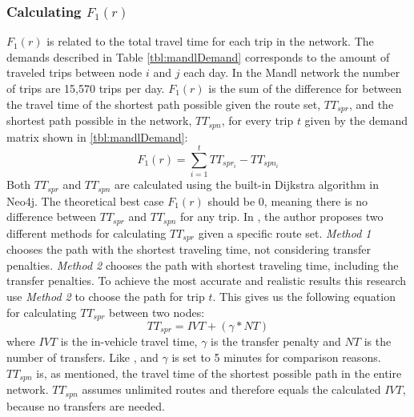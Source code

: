\subsubsection{Calculating $F_{1}(r)$}
\label{sec:f1}
$F_{1}(r)$ is related to the total travel time for each trip in the network. The demands described in Table \vref{tbl:mandlDemand} corresponds to the amount of traveled trips between node $i$ and $j$ each day. In the Mandl network the number of trips are 15,570 trips per day. $F_{1}(r)$ is the sum of the difference for between the travel time of the shortest path possible given the route set, $TT_{spr}$, and the shortest path possible in the network, $TT_{spn}$, for every trip $t$ given by the demand matrix shown in \vref{tbl:mandlDemand}:
\newline
$$F_{1}(r) = \sum\limits^{t}_{i=1}TT_{spr_i}-TT_{spn_i}$$
\newline
Both $TT_{spr}$ and $TT_{spn}$ are calculated using the built-in Dijkstra algorithm in Neo4j. The theoretical best case $F_{1}(r)$ should be 0, meaning there is no difference between $TT_{spr}$ and $TT_{spn}$ for any trip. In \citet{mandl79}, the author proposes two different methods for calculating $TT_{spr}$ given a specific route set. \textit{Method 1} chooses the path with the shortest traveling time, not considering transfer penalties. \textit{Method 2} chooses the path with shortest traveling time, including the transfer penalties. To achieve the most accurate and realistic results this research use \textit{Method 2} to choose the path for trip $t$. This gives us the following equation for calculating $TT_{spr}$ between two nodes: 
\newline
$$TT_{spr} = IVT + (\gamma*NT)$$
\newline
where $IVT$ is the in-vehicle travel time, $\gamma$ is the transfer penalty and $NT$ is the number of transfers. Like \citet{kechagiopoulos14}, \citet{nikolic14} and \citet{mandl79} $\gamma$ is set to 5 minutes for comparison reasons. $TT_{spn}$ is, as mentioned, the travel time of the shortest possible path in the entire network. $TT_{spn}$ assumes unlimited routes and therefore equals the calculated $IVT$, because no transfers are needed.  

